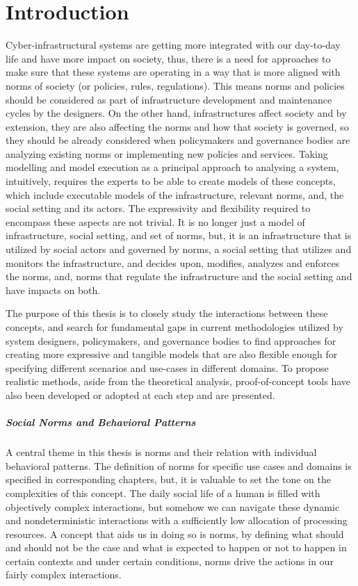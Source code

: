 \chapter{Introduction}
\label{ch:intro}
Cyber-infrastructural systems are getting more integrated with our day-to-day life and have more impact on society, thus, there is a need for approaches to make sure that these systems are operating in a way that is more aligned with norms of society (or policies, rules, regulations). This means norms and policies should be considered as part of infrastructure development and maintenance cycles by the designers. On the other hand, infrastructures affect society and by extension, they are also affecting the norms and how that society is governed, so they should be already considered when policymakers and governance bodies are analyzing existing norms or implementing new policies and services. Taking modelling and model execution as a principal approach to analysing a system, intuitively, requires the experts to be able to create models of these concepts, which include executable models of the infrastructure, relevant norms, and, the social setting and its actors. The expressivity and flexibility required to encompass these aspects are not trivial. It is no longer just a model of infrastructure, social setting, and set of norms, but, it is an infrastructure that is utilized by social actors and governed by norms, a social setting that utilizes and monitors the infrastructure, and decides upon, modifies, analyzes and enforces the norms, and, norms that regulate the infrastructure and the social setting and have impacts on both.


The purpose of this thesis is to closely study the interactions between these concepts, and search for fundamental gaps in current methodologies utilized by system designers, policymakers, and governance bodies to find approaches for creating more expressive and tangible models that are also flexible enough for specifying different scenarios and use-cases in different domains. To propose realistic methods, aside from the theoretical analysis, proof-of-concept tools have also been developed or adopted at each step and are presented.


\paragraph{Social Norms and Behavioral Patterns}
A central theme in this thesis is norms and their relation with individual behavioral patterns. The definition of norms for specific use cases and domains is specified in corresponding chapters, but, it is valuable to set the tone on the complexities of this concept. The daily social life of a human is filled with objectively complex interactions, but somehow we can navigate these dynamic and nondeterministic interactions with a sufficiently low allocation of processing resources. A concept that aids us in doing so is norms, by defining what should and should not be the case and what is expected to happen or not to happen in certain contexts and under certain conditions, norms drive the actions in our fairly complex interactions. 


